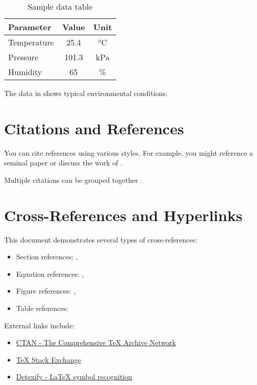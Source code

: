\documentclass[12pt,a4paper]{article}
\begin{document}
\begin{table}[H]
    \centering
    \caption{Sample data table}
    \label{tab:sample-data}
    \begin{tabular}{@{}lcc@{}}
        \toprule
        Parameter & Value & Unit \\
        \midrule
        Temperature & 25.4 & °C \\
        Pressure & 101.3 & kPa \\
        Humidity & 65 & \% \\
        \bottomrule
    \end{tabular}
\end{table}

The data in  shows typical environmental conditions.

\section{Citations and References}\label{sec:citations}

You can cite references using various styles. For example, you might reference a seminal paper \parencite{einstein1905} or discuss the work of \textcite{newton1687}.

Multiple citations can be grouped together \parencite{einstein1905,newton1687}.

\section{Cross-References and Hyperlinks}\label{sec:cross-refs}

This document demonstrates several types of cross-references:

\begin{itemize}
    \item Section references: , 
    \item Equation references: , 
    \item Figure references: , 
    \item Table references: 
\end{itemize}

External links include:
\begin{itemize}
    \item \href{https://www.ctan.org/}{CTAN - The Comprehensive TeX Archive Network}
    \item \href{https://tex.stackexchange.com/}{TeX Stack Exchange}
    \item \href{https://detexify.kirelabs.org/classify.html}{Detexify - LaTeX symbol recognition}
\end{itemize}
\end{document}
